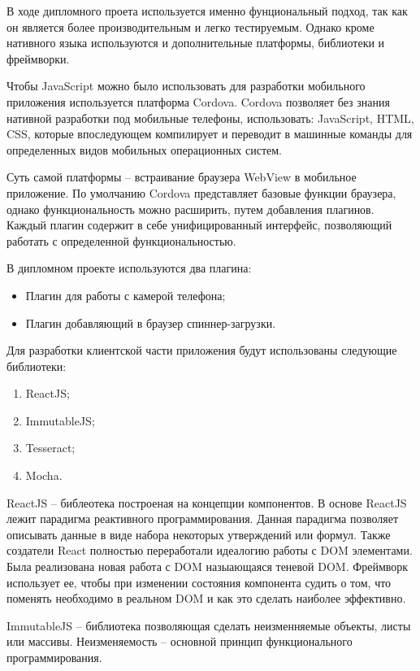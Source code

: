 В ходе дипломного проета используется именно фунциональный подход, так как он является более производительным и легко тестируемым. Однако кроме нативного языка используются и дополнительные платформы, библиотеки и фреймворки.

Чтобы JavaScript можно было использовать для разработки мобильного приложения используется платформа Cordova. Cordova позволяет без знания нативной разработки под мобильные телефоны, использовать: JavaScript, HTML, CSS, которые впоследующем компилирует и переводит в машинные команды для определенных видов мобильных операционных систем. 

Суть самой платформы -- встраивание браузера WebView в мобильное приложение. По умолчанию Cordova представляет базовые функции браузера, однако функциональность можно расширить, путем добавления плагинов. Каждый плагин содержит в себе унифицированный интерфейс, позволяющий работать с определенной функциональностью. 

В дипломном проекте используются два плагина:
\begin{itemize}
  \item Плагин для работы с камерой телефона;
  \item Плагин добавляющий в браузер спиннер-загрузки.
\end{itemize}

Для разработки клиентской части приложения  будут использованы следующие библиотеки:
\begin{enumerate}
\item ReactJS;
\item ImmutableJS;
\item Tesseract;
\item Mocha.
\end{enumerate}

ReactJS -- библеотека построеная на концепции компонентов. В основе ReactJS лежит парадигма реактивного программирования. Данная парадигма позволяет описывать данные в виде набора некоторых утверждений или формул. Также создатели React полностью переработали идеалогию работы с DOM элементами. Была реализована новая работа с DOM назыающаяся теневой DOM. Фреймворк использует ее, чтобы при изменении состояния компонента судить о том, что поменять необходимо в реальном DOM и как это сделать наиболее эффективно.

ImmutableJS -- библиотека позволяющая сделать неизменняемые объекты, листы или массивы. Неизменяемость -- основной принцип функционального программирования.

